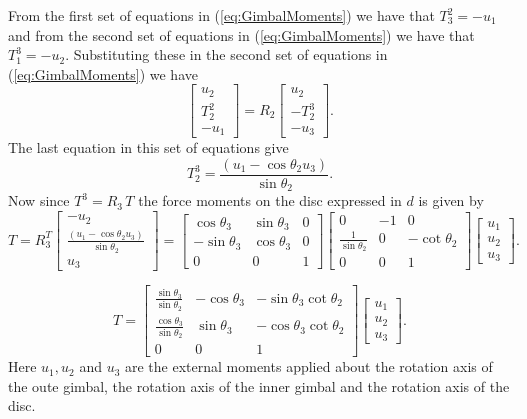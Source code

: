 \documentclass[graybox,envcountchap,sectrefs]{svmonoMuga}
\begin{document}
From the first set of equations in (\ref{eq:GimbalMoments}) we have that $T^2_3=-u_1$ and from the second set of equations in (\ref{eq:GimbalMoments}) we have that $T_1^3=-
u_2$. Substituting these in the second set of equations in (\ref{eq:GimbalMoments}) we have
\[
\left[
\begin{array}{c}
u_2\\ T^2_2 \\ -u_1
\end{array}
\right] =
R_2 \left[
\begin{array}{c}
u_2\\ -T_2^3 \\ -u_3
\end{array}
\right].
\]
The last equation in this set of equations give
\[
T^3_2=\frac{(u_1-\cos{\theta_2}u_3)}{\sin{\theta_2}}.
\]
Now since $T^3=R_3\,T$ the force moments on the disc expressed in $d$ is given by
\[
T=
R_3^T \left[
\begin{array}{c}
-u_2\\ \frac{(u_1-\cos{\theta_2}u_3)}{\sin{\theta_2}} \\ u_3
\end{array}
\right]=\left[
\begin{array}{ccc}
\cos{\theta_3} & \sin{\theta_3} & 0 \\
-\sin{\theta_3} & \cos{\theta_3} & 0\\
0 & 0 & 1
\end{array}
\right]\left[
\begin{array}{ccc}
0 & -1 & 0 \\
\frac{1}{\sin{\theta_2}} & 0 & -\cot{\theta_2}\\
0 & 0 & 1
\end{array}
\right]\left[
\begin{array}{c}
u_1\\ u_2 \\ u_3
\end{array}
\right].
\]

\[
T=\left[
\begin{array}{ccc}
\frac{\sin{\theta_3}}{\sin{\theta_2}} & -\cos{\theta_3} & -\sin{\theta_3}\cot{\theta_2} \\
\frac{\cos{\theta_3}}{\sin{\theta_2}} & \sin{\theta_3} & -\cos{\theta_3}\cot{\theta_2}\\
0 & 0 & 1
\end{array}
\right]\left[
\begin{array}{c}
u_1\\ u_2 \\ u_3
\end{array}
\right].
\]
Here $u_1,u_2$ and $u_3$ are the external moments applied about the rotation axis of the oute gimbal, the rotation axis of the inner gimbal and the rotation axis of the disc.
\end{document}
